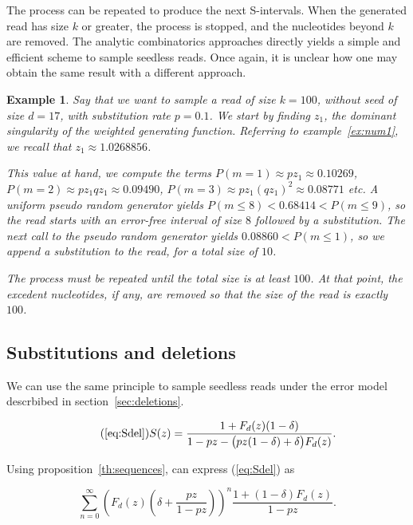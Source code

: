 \documentclass{article}
\newtheorem{example}{Example}
\begin{document}
The process can be repeated to produce the next S-intervals.
When the generated read has size $k$ or greater, the process is stopped,
and the nucleotides beyond $k$ are removed. The analytic combinatorics
approaches directly yields a simple and efficient scheme to sample
seedless reads. Once again, it is unclear how one may obtain the same
result with a different approach.

\begin{example}
Say that we want to sample a read of size $k=100$, without seed of size
$d=17$, with substitution rate $p = 0.1$. We start by finding $z_1$, the
dominant singularity of the weighted generating function. Referring to
example~\ref{ex:num1}, we recall that $z_1 \approx 1.0268856$.

This value at hand, we compute the terms $P(m = 1) \approx pz_1 \approx
0.10269$, $P(m = 2) \approx pz_1qz_1 \approx 0.09490$, $P(m = 3) \approx
pz_1(qz_1)^2 \approx 0.08771$ \textit{etc}. A uniform pseudo random
generator yields $P(m \leq 8) < 0.68414 < P(m \leq 9)$, so the read starts
with an error-free interval of size $8$ followed by a substitution.  The
next call to the pseudo random generator yields $0.08860 < P(m \leq 1)$,
so we append a substitution to the read, for a total size of $10$.

The process must be repeated until the total size is at least $100$. At
that point, the excedent nucleotides, if any, are removed so that the size
of the read is exactly $100$.
\end{example}




\subsection{Substitutions and deletions}

We can use the same principle to sample seedless reads under the error
model descrbibed in section~\ref{sec:deletions}.

\begin{equation}
\tag{\ref{eq:Sdel}}
S(z) = \frac{1+F_d(z)(1-\delta)}{1-pz-\big(pz(1-\delta)
  + \delta\big) F_d(z)}.
\end{equation}

Using proposition~\ref{th:sequences}, can express (\ref{eq:Sdel}) as

\begin{equation*}
  \sum_{n=0}^\infty \left(F_d(z) \left( \delta + \frac{pz}{1-pz}\right)
  \right)^n \frac{1+(1-\delta)F_d(z)}{1-pz}.
\end{equation*}
\end{document}
